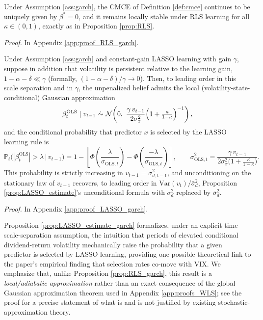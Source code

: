 \begin{proposition}\label{prop:RLS_garch}
Under Assumption \ref{ass:garch}, the CMCE of Definition \ref{def:cmce} continues to be uniquely given
by $\beta^*=0$, and it remains locally stable under RLS learning for all $\kappa\in(0,1)$, exactly as
in Proposition \ref{prop:RLS}.
\end{proposition}
\textit{Proof.} In Appendix \ref{app:proof_RLS_garch}.

\begin{proposition}\label{prop:LASSO_estimate_garch}
Under Assumption \ref{ass:garch} and constant-gain LASSO learning with gain $\gamma$, suppose in
addition that volatility is persistent relative to the learning gain, $1-\alpha-\delta \ll \gamma$
(formally, $(1-\alpha-\delta)/\gamma \to 0$). Then, to leading order in this scale separation and in
$\gamma$, the unpenalized belief admits the local (volatility-state-conditional) Gaussian approximation
\begin{equation}\label{eq:local_gaussian_garch}
\beta_t^{\mathrm{OLS}} \mid v_{t-1} \ \dot\sim\ \mathcal N\!\left(0,\ \frac{\gamma\, v_{t-1}}{2\sigma_x^2}\Bigl(1+\tfrac{\kappa}{1-\kappa}\Bigr)^{-1}\right),
\end{equation}
and the conditional probability that predictor $x$ is selected by the LASSO learning rule is
\begin{equation}\label{eq:conditional_selection_prob}
\mathbb P_t\bigl(|\beta_t^{\mathrm{OLS}}|>\lambda \,\big|\, v_{t-1}\bigr)
= 1-\left[\Phi\!\left(\frac{\lambda}{\sigma_{\mathrm{OLS},t}}\right)-\Phi\!\left(\frac{-\lambda}{\sigma_{\mathrm{OLS},t}}\right)\right],
\qquad
\sigma_{\mathrm{OLS},t}^2 = \frac{\gamma\, v_{t-1}}{2\sigma_x^2\bigl(1+\frac{\kappa}{1-\kappa}\bigr)}.
\end{equation}
This probability is strictly increasing in $v_{t-1}=\sigma_{d,t-1}^2$, and unconditioning on the
stationary law of $v_{t-1}$ recovers, to leading order in $\mathrm{Var}(v_t)/\bar\sigma_d^2$,
Proposition \ref{prop:LASSO_estimate}'s unconditional formula with $\sigma_d^2$ replaced by $\bar\sigma_d^2$.
\end{proposition}
\textit{Proof.} In Appendix \ref{app:proof_LASSO_garch}.

Proposition \ref{prop:LASSO_estimate_garch} formalizes, under an explicit time-scale-separation
assumption, the intuition that periods of elevated conditional dividend-return volatility mechanically
raise the probability that a given predictor is selected by LASSO learning, providing one possible
theoretical link to the paper's empirical finding that selection rates co-move with VIX. We emphasize
that, unlike Proposition \ref{prop:RLS_garch}, this result is a \emph{local/adiabatic approximation}
rather than an exact consequence of the global Gaussian approximation theorem used in Appendix
\ref{app:proofs_WLS}; see the proof for a precise statement of what is and is not justified by existing
stochastic-approximation theory.
